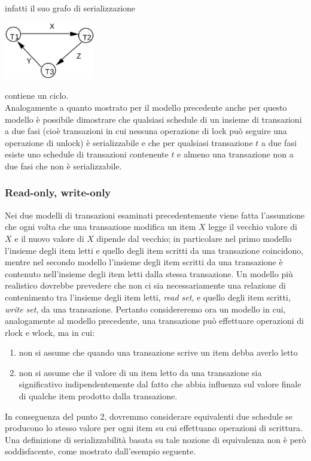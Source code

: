 infatti il suo grafo di serializzazione
\begin{center}
 \includegraphics[width=150px]{img_6_3_2.eps}
\end{center}
contiene un ciclo.\\

Analogamente a quanto mostrato per il modello precedente anche per questo modello è possibile
dimostrare che qualsiasi schedule di un insieme di transazioni a due fasi (cioè transazioni in cui
nessuna operazione di lock può seguire una operazione di unlock) è serializzabile e che per qualsiasi
transazione $t$ a due fasi esiste uno schedule di transazioni contenente $t$ e almeno una transazione
non a due fasi che non è serializzabile.

\subsubsection{Read-only, write-only}
Nei due modelli di transazioni esaminati precedentemente viene fatta l'assunzione che ogni volta
che una transazione modifica un item $X$ legge il vecchio valore di $X$ e il nuovo valore di $X$ dipende
dal vecchio; in particolare nel primo modello l'insieme degli item letti e quello degli item scritti da
una transazione coincidono, mentre nel secondo modello l'insieme degli item scritti da una
transazione è contenuto nell'insieme degli item letti dalla stessa transazione. Un modello più
realistico dovrebbe prevedere che non ci sia necessariamente una relazione di contenimento tra
l'insieme degli item letti, \emph{read set}, e quello degli item scritti, \emph{write set}, da una transazione. Pertanto
considereremo ora un modello in cui, analogamente al modello precedente, una transazione può
effettuare operazioni di rlock e wlock, ma in cui:
\begin{enumerate}
 \item non si assume che quando una transazione scrive un item debba averlo letto
 \item non si assume che il valore di un item letto da una transazione sia significativo
indipendentemente dal fatto che abbia influenza sul valore finale di qualche item prodotto dalla
transazione.
\end{enumerate}
In conseguenza del punto 2, dovremmo considerare equivalenti due schedule se producono lo stesso valore
per ogni item su cui effettuano operazioni di scrittura. Una definizione di serializzabilità basata su
tale nozione di equivalenza non è però soddisfacente, come mostrato dall'esempio seguente.\\

